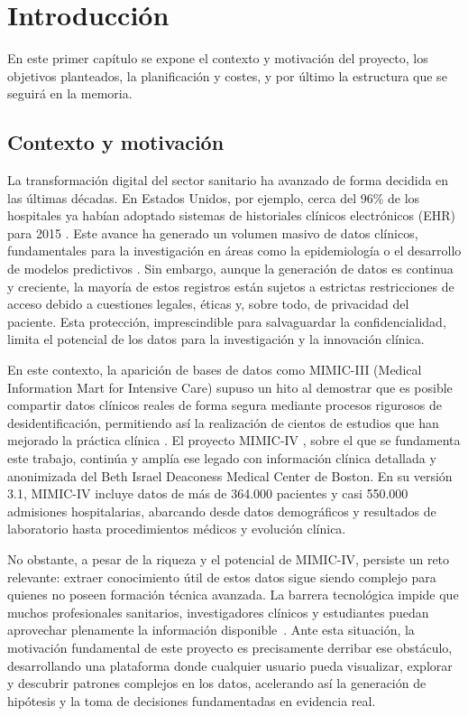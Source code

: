 \chapter{Introducción}

En este primer capítulo se expone el contexto y motivación del proyecto, los objetivos planteados, la planificación y costes, y por último la estructura que se seguirá en la memoria.

\section{Contexto y motivación}

La transformación digital del sector sanitario ha avanzado de forma decidida en las últimas décadas. En Estados Unidos, por ejemplo, cerca del 96\% de los hospitales ya habían adoptado sistemas de historiales clínicos electrónicos (EHR) para 2015 \cite{Henry2016_EHR}. Este avance ha generado un volumen masivo de datos clínicos, fundamentales para la investigación en áreas como la epidemiología o el desarrollo de modelos predictivos \cite{Halevy2009_data}. Sin embargo, aunque la generación de datos es continua y creciente, la mayoría de estos registros están sujetos a estrictas restricciones de acceso debido a cuestiones legales, éticas y, sobre todo, de privacidad del paciente. Esta protección, imprescindible para salvaguardar la confidencialidad, limita el potencial de los datos para la investigación y la innovación clínica.

En este contexto, la aparición de bases de datos como MIMIC-III \cite{MIMICIII_paper} (Medical Information Mart for Intensive Care) supuso un hito al demostrar que es posible compartir datos clínicos reales de forma segura mediante procesos rigurosos de desidentificación, permitiendo así la realización de cientos de estudios que han mejorado la práctica clínica \cite{Kallout2025_contribution}. El proyecto MIMIC-IV \cite{MIMICIV_paper, MIMICIV_dataset}, sobre el que se fundamenta este trabajo, continúa y amplía ese legado con información clínica detallada y anonimizada del Beth Israel Deaconess Medical Center de Boston. En su versión 3.1, MIMIC-IV incluye datos de más de 364.000 pacientes y casi 550.000 admisiones hospitalarias, abarcando desde datos demográficos y resultados de laboratorio hasta procedimientos médicos y evolución clínica.

\newpage
No obstante, a pesar de la riqueza y el potencial de MIMIC-IV, persiste un reto relevante: extraer conocimiento útil de estos datos sigue siendo complejo para quienes no poseen formación técnica avanzada. La barrera tecnológica impide que muchos profesionales sanitarios, investigadores clínicos y estudiantes puedan aprovechar plenamente la información disponible~\cite{Khaled2025,AlAttrach2025}. Ante esta situación, la motivación fundamental de este proyecto es precisamente derribar ese obstáculo, desarrollando una plataforma donde cualquier usuario pueda visualizar, explorar y descubrir patrones complejos en los datos, acelerando así la generación de hipótesis y la toma de decisiones fundamentadas en evidencia real.


